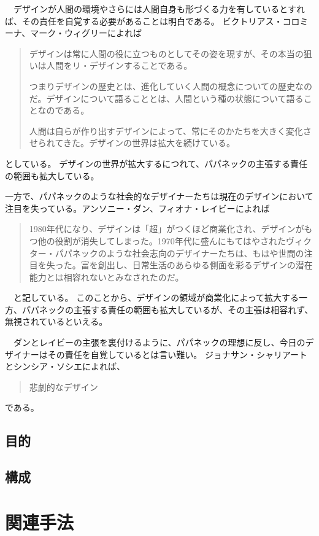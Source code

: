 \documentclass{jsarticle}
\begin{document}
　デザインが人間の環境やさらには人間自身も形づくる力を有しているとすれば、その責任を自覚する必要があることは明白である。
ビクトリアス・コロミーナ、マーク・ウィグリー\cite{arewehuman}によれば
\begin{quotation}
  デザインは常に人間の役に立つものとしてその姿を現すが、その本当の狙いは人間をリ・デザインすることである。

  つまりデザインの歴史とは、進化していく人間の概念についての歴史なのだ。デザインについて語ることとは、人間という種の状態について語ることなのである。

  人間は自らが作り出すデザインによって、常にそのかたちを大きく変化させられてきた。デザインの世界は拡大を続けている。
\end{quotation}
としている。
デザインの世界が拡大するにつれて、パパネックの主張する責任の範囲も拡大している。

一方で、パパネックのような社会的なデザイナーたちは現在のデザインにおいて注目を失っている。アンソニー・ダン、フィオナ・レイビー\cite{Speculative}によれば
\begin{quotation}
  1980年代になり、デザインは「超」がつくほど商業化され、デザインがもつ他の役割が消失してしまった。1970年代に盛んにもてはやされたヴィクター・パパネックのような社会志向のデザイナーたちは、もはや世間の注目を失った。富を創出し、日常生活のあらゆる側面を彩るデザインの潜在能力とは相容れないとみなされたのだ。
\end{quotation}
　と記している。
このことから、デザインの領域が商業化によって拡大する一方、パパネックの主張する責任の範囲も拡大しているが、その主張は相容れず、無視されているといえる。


　ダンとレイビーの主張を裏付けるように、パパネックの理想に反し、今日のデザイナーはその責任を自覚しているとは言い難い。
ジョナサン・シャリアートとシンシア・ソシエ\cite{tragetic}によれば、
\begin{quotation}
  悲劇的なデザイン
\end{quotation}

である。

\newpage
\subsection{目的}
\newpage
\subsection{構成}


\newpage
\section{関連手法}
\end{document}
